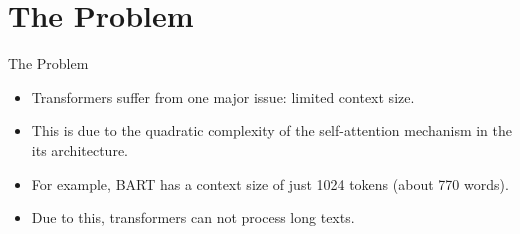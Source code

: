 \section{The Problem}

\begin{frame}{The Problem}

  \begin{itemize}
    \item Transformers suffer from one major issue: limited context size.
    \item This is due to the quadratic complexity of the self-attention mechanism in the its architecture.
    \item For example, BART has a context size of just 1024 tokens (about 770 words).
    \item Due to this, transformers can not process long texts.
  \end{itemize}

\end{frame}
